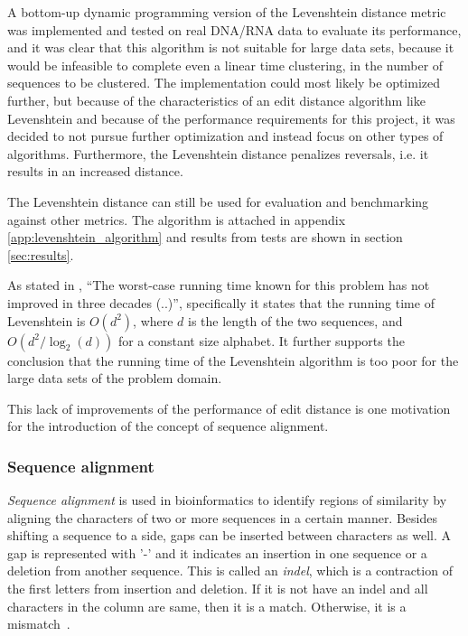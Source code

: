 A bottom-up dynamic programming version of the Levenshtein distance metric was
implemented and tested on real DNA/RNA data to evaluate its performance, and it
was clear that this algorithm is not suitable for large data sets, because it
would be infeasible to complete even a linear time clustering, in the number of
sequences to be clustered. The implementation could most likely be optimized
further, but because of the characteristics of an edit distance algorithm like
Levenshtein and because of the performance requirements for this project, it
was decided to not pursue further optimization and instead focus on other types
of algorithms. Furthermore, the Levenshtein distance penalizes reversals, i.e.
it results in an increased distance.

The Levenshtein distance can still be used for evaluation and benchmarking
against other metrics. The algorithm is attached in appendix
\ref{app:levenshtein_algorithm} and results from tests are shown in section
\ref{sec:results}.

As stated in \cite[pp.~1-2]{andoni}, ``The worst-case running time known for
this problem has not improved in three decades (..)'', specifically it states
that the running time of Levenshtein is $O(d^2)$, where $d$ is the length of
the two sequences, and $O(d^2/\log_2(d))$ for a constant size alphabet. It
further supports the conclusion that the running time of the Levenshtein
algorithm is too poor for the large data sets of the problem domain.

This lack of improvements of the performance of edit distance is one motivation
for the introduction of the concept of sequence alignment.



\subsubsection{Sequence alignment}

\emph{Sequence alignment} is used in bioinformatics to identify regions of
similarity by aligning the characters of two or more sequences in a certain
manner. Besides shifting a sequence to a side, gaps can be inserted between
characters as well. A gap is represented with '-' and it indicates an insertion
in one sequence or a deletion from another sequence. This is called an
\emph{indel}, which is a contraction of the first letters from insertion and
deletion. If it is not have an indel and all characters in the column are same,
then it is a match. Otherwise, it is a mismatch~\cite[pp.~135-136]{dong}.

